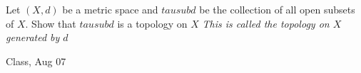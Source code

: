 \begin{samepage}
\begin{ex}
Let $(X, d)$ be a metric space and $tau sub d$ be the collection of all open subsets of $X$. 
Show that $tau sub d$ is a topology on $X$
\vspace{0.5cm}
\textit{This is called the topology on $X$ generated by $d$}
\end{ex}
\begin{source}
Class, Aug 07
\end{source}
\end{samepage}
